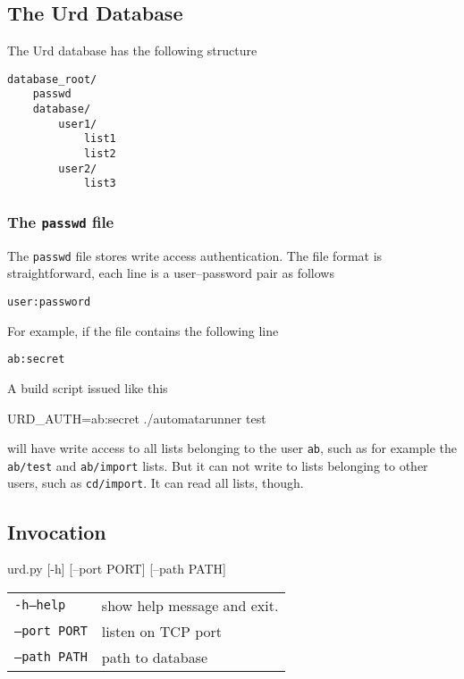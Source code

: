\subsection{The Urd Database}
The Urd database has the following structure
\begin{verbatim}
database_root/
    passwd
    database/
        user1/
            list1
            list2
        user2/
            list3
\end{verbatim}

\subsubsection{The \texttt{passwd} file}
The \texttt{passwd} file stores write access authentication.  The file
format is straightforward, each line is a user--password pair as follows
\begin{verbatim}
user:password
\end{verbatim}
For example, if the file contains the following line
\begin{verbatim}
ab:secret
\end{verbatim}
A build script issued like this
\begin{shell}
URD_AUTH=ab:secret ./automatarunner test
\end{shell}
will have write access to all lists belonging to the user \texttt{ab},
such as for example the \texttt{ab/test} and \texttt{ab/import} lists.
But it can not write to lists belonging to other users, such
as \texttt{cd/import}.  It can read all lists, though.


\subsection{Invocation}
\begin{shell}
urd.py [-h] [--port PORT] [--path PATH]
\end{shell}

\begin{snugshade}
\begin{tabular}{p{4cm}p{9cm}}
  \texttt{-h}\hspace{3cm}\texttt{---help} & show help message and
  exit.\\[4ex]

  \texttt{---port PORT} & listen on TCP port\\[4ex]

  \texttt{---path PATH} & path to database\\[4ex]
\end{tabular}
\end{snugshade}



